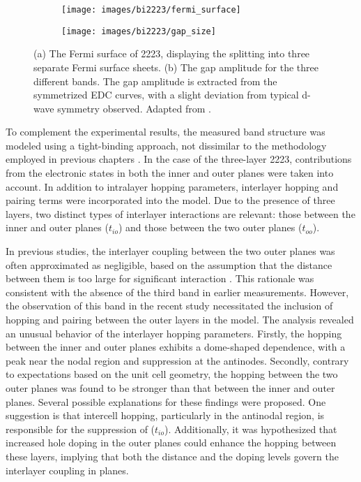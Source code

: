 \begin{figure}[t]
	\centering
	\begin{subfigure}[b]{0.59\textwidth}
		\texttt{[image: images/bi2223/fermi\_surface]}
		\caption{}
	\end{subfigure}
	\hfill
	\begin{subfigure}[b]{0.4\textwidth}
		\texttt{[image: images/bi2223/gap\_size]}
		\caption{}
	\end{subfigure}
	\caption{(a) The Fermi surface of 2223, displaying the splitting into three separate Fermi surface sheets. (b) The gap amplitude for the three different bands. The gap amplitude is extracted from the symmetrized EDC curves, with a slight deviation from typical d-wave symmetry observed. Adapted from \cite{luo_electronic_2023}.}
	\label{fig:arpes_sketch}
\end{figure}

To complement the experimental results, the measured band structure was modeled using a tight-binding approach, not dissimilar to the methodology employed in previous chapters \cite{luo_subtle_2021}.
In the case of the three-layer 2223, contributions from the electronic states in both the inner and outer  planes were taken into account.
In addition to intralayer hopping parameters, interlayer hopping and pairing terms were incorporated into the model.
Due to the presence of three layers, two distinct types of interlayer interactions are relevant: those between the inner and outer planes ($t_{io}$) and those between the two outer planes ($t_{oo}$).

In previous studies, the interlayer coupling between the two outer planes was often approximated as negligible, based on the assumption that the distance between them is too large for significant interaction \cite{kunisada_observation_2017,ideta_hybridization_2021}.
This rationale was consistent with the absence of the third band in earlier measurements.
However, the observation of this band in the recent study \cite{luo_electronic_2023} necessitated the inclusion of hopping and pairing between the outer layers in the model.
The analysis revealed an unusual behavior of the interlayer hopping parameters.
Firstly, the hopping between the inner and outer planes exhibits a dome-shaped dependence, with a peak near the nodal region and suppression at the antinodes.
Secondly, contrary to expectations based on the unit cell geometry, the hopping between the two outer planes was found to be stronger than that between the inner and outer planes.
Several possible explanations for these findings were proposed.
One suggestion is that intercell hopping, particularly in the antinodal region, is responsible for the suppression of ($t_{io}$).
Additionally, it was hypothesized that increased hole doping in the outer planes could enhance the hopping between these layers, implying that both the distance and the doping levels govern the interlayer coupling in  planes.

